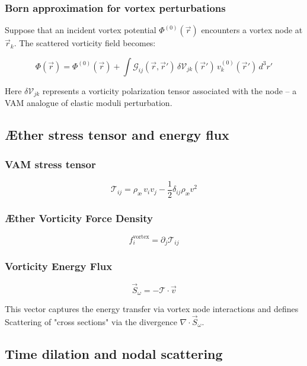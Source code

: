 \subsubsection*{Born approximation for vortex perturbations}

Suppose that an incident vortex potential \(\Phi^{(0)}(\vec{r})\) encounters a vortex node at \(\vec{r}_k\). The scattered vorticity field becomes:

\[
    \Phi(\vec{r}) = \Phi^{(0)}(\vec{r}) + \int \mathcal{G}_{ij}(\vec{r}, \vec{r}') \, \delta \mathcal{V}_{jk}(\vec{r}') \, v_k^{(0)}(\vec{r}') \, d^3r'
\]

Here \(\delta \mathcal{V}_{jk}\) represents a vorticity polarization tensor associated with the node – a VAM analogue of elastic moduli perturbation.

\subsection{Æther stress tensor and energy flux}

\subsubsection*{VAM stress tensor}

\[
    \mathcal{T}_{ij} = \rho_{\text{\ae}} \, v_i v_j - \frac{1}{2} \delta_{ij} \rho_{\text{\ae}} v^2
\]

\subsubsection*{Æther Vorticity Force Density}

\[
    f_i^{\text{vortex}} = \partial_j \mathcal{T}_{ij}
\]

\subsubsection*{Vorticity Energy Flux}

\[
    \vec{S}_\omega = - \mathcal{T} \cdot \vec{v}
\]

This vector captures the energy transfer via vortex node interactions and defines Scattering of "cross sections" via the divergence \(\nabla \cdot \vec{S}_\omega\).

\subsection{Time dilation and nodal scattering}

